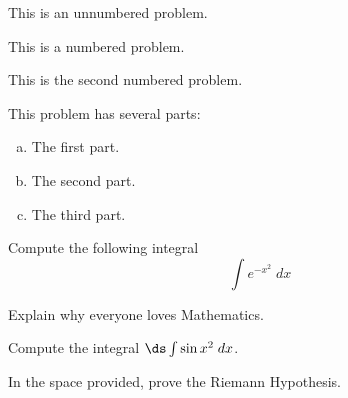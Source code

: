 \documentclass[11pt,letterpaper]{article}
\begin{document}


\prob This is an unnumbered problem. \pspace


\problem This is a numbered problem. \vspace{1.5cm}


 This is the second numbered problem. \vfill


\problem This problem has several parts:
	\begin{enumerate}[(a)]
	\item The first part.
	\item The second part. 
	\item The third part. 
	\end{enumerate} \vspace{6cm}



\newpage



\problem Compute the following integral
	\[
	\int e^{-x^2} \;dx
	\] \vspace{3cm}


\problem Explain why everyone loves Mathematics. \pspace


\problem Compute the integral $\ds \int \sin x^2 \;dx$. \vspace{2cm}


\problem In the space provided, prove the Riemann Hypothesis.
\end{document}
